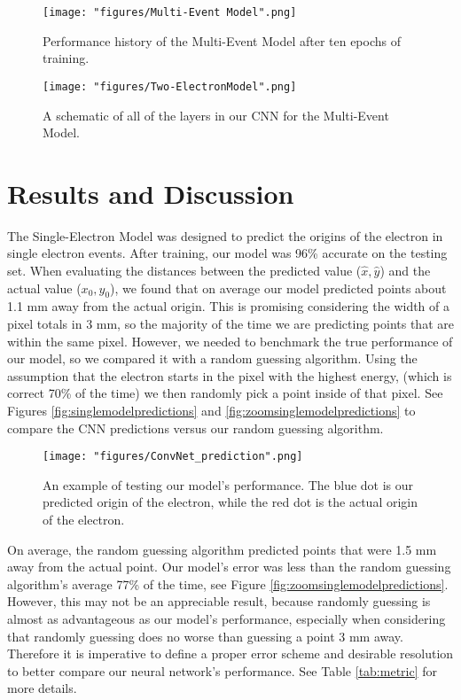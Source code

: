 \documentclass[12pt]{article}
\begin{document}
\begin{figure}[H]
    \centering
    \texttt{[image: "figures/Multi-Event Model".png]}
    \caption{Performance history of the Multi-Event Model after ten epochs of training.}
    \label{fig:multi-electron-model}
\end{figure}
\begin{figure}[H]
    \centering
    \texttt{[image: "figures/Two-ElectronModel".png]}
    \caption{A schematic of all of the layers in our CNN for the Multi-Event Model.}
    \label{fig:CNN_2}
\end{figure}

\section{Results and Discussion}

The Single-Electron Model was designed to predict the origins of the electron in single electron events. After training, our model was 96\% accurate on the testing set. When evaluating the distances between the predicted value ($\hat{x}, \hat{y}$) and the actual value ($x_{0},y_{0}$), we found that on average our model predicted points about 1.1 mm away from the actual origin. This is promising considering the width of a pixel totals in 3 mm, so the majority of the time we are predicting points that are within the same pixel. However, we needed to benchmark the true performance of our model, so we compared it with a random guessing algorithm. Using the assumption that the electron starts in the pixel with the highest energy, (which is correct 70\% of the time) we then randomly pick a point inside of that pixel. See Figures \ref{fig:singlemodelpredictions} and \ref{fig:zoomsinglemodelpredictions} to compare the CNN predictions versus our random guessing algorithm. 
\begin{wrapfigure}{r}{0.5\textwidth}
    \vspace{-20pt}
    \texttt{[image: "figures/ConvNet\_prediction".png]}
    \vspace{-40pt}
    \caption{An example of testing our model's performance. The blue dot is our predicted origin of the electron, while the red dot is the actual origin of the electron.}
    \label{fig:CNN_prediction}
\end{wrapfigure}
On average, the random guessing algorithm predicted points that were 1.5 mm away from the actual point. Our model's error was less than the random guessing algorithm's average 77\% of the time, see Figure \ref{fig:zoomsinglemodelpredictions}. However, this may not be an appreciable result, because randomly guessing is almost as advantageous as our model's performance, especially when considering that randomly guessing does no worse than guessing a point 3 mm away. Therefore it is imperative to define a proper error scheme and desirable resolution to better compare our neural network's performance. See Table \ref{tab:metric} for more details. 
\end{document}
